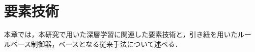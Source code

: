 \chapter{要素技術}

  本章では，本研究で用いた深層学習に関連した要素技術と，引き紐を用いたルールベース制御器，ベースとなる従来手法について述べる．

\label{chap:technology}
%






%
